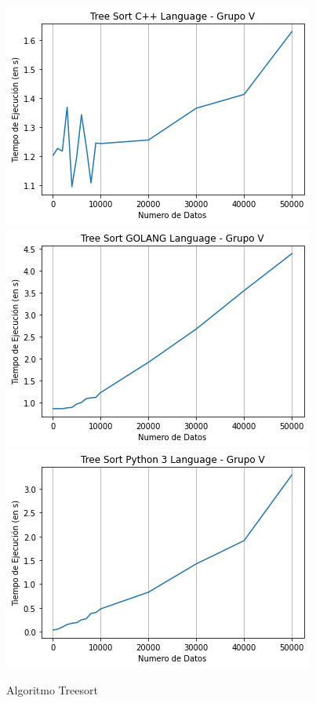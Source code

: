 \documentclass{article}
\begin{document}
 
    \begin{figure}[H] %
        \centering
        \includegraphics[scale=0.6]{img/treesortcpp.png}
        \includegraphics[scale=0.6]{img/treesortgo.png}
        \includegraphics[scale=0.6]{img/treesortpy.png}
        \caption{Algoritmo Treesort}
        \label{fig:my_label}
    \end{figure}
\end{document}
